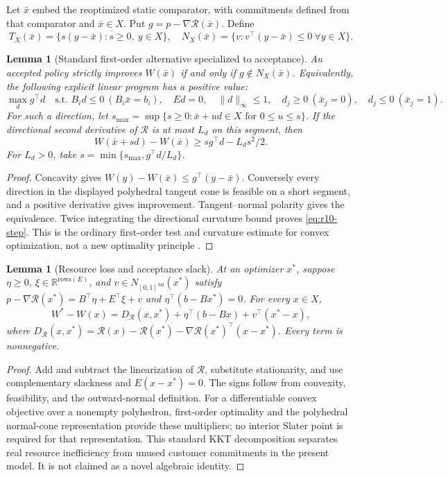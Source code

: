 \documentclass[11pt,letterpaper]{article}
\newtheorem{lemma}[theorem]{Lemma}
\theoremstyle{definition}
\newcommand{\R}{\mathbb R}
\newcommand{\1}{\mathbf 1}
\begin{document}
Let $\bar x$ embed the reoptimized static comparator, with commitments defined from that comparator and $\bar x\in X$. Put $g=p-\nabla\mathcal R(\bar x)$. Define
\[
 T_X(\bar x)=\overline{\{s(y-\bar x):s\geq0,\ y\in X\}},\quad
 N_X(\bar x)=\{v:v^\top(y-\bar x)\leq0\ \forall y\in X\}.
\]
\begin{lemma}[Standard first-order alternative specialized to acceptance]\label{lem:r10-alternative}
An accepted policy strictly improves $W(\bar x)$ if and only if $g\notin N_X(\bar x)$. Equivalently, the following explicit linear program has a positive value:
\[
 \max_d g^\top d\quad\text{s.t. } B_i d\leq0\ (B_i\bar x=b_i),\quad Ed=0,\quad
 \|d\|_\infty\leq1,\quad
 d_j\geq0\ (\bar x_j=0),\quad d_j\leq0\ (\bar x_j=1).
\]
For such a direction, let $s_{\max}=\sup\{s\geq0:\bar x+ud\in X\text{ for }0\leq u\leq s\}$. If the directional second derivative of $\mathcal R$ is at most $L_d$ on this segment, then
\begin{equation}\label{eq:r10-step}
 W(\bar x+sd)-W(\bar x)\geq s g^\top d-L_ds^2/2.
\end{equation}
For $L_d>0$, take $s=\min\{s_{\max},g^\top d/L_d\}$.
\end{lemma}
\begin{proof}
Concavity gives $W(y)-W(\bar x)\leq g^\top(y-\bar x)$. Conversely every direction in the displayed polyhedral tangent cone is feasible on a short segment, and a positive derivative gives improvement. Tangent--normal polarity gives the equivalence. Twice integrating the directional curvature bound proves \eqref{eq:r10-step}. This is the ordinary first-order test and curvature estimate for convex optimization, not a new optimality principle \citep{BoydVandenberghe2004}.
\end{proof}

\begin{lemma}[Resource loss and acceptance slack]\label{lem:r10-bregman}
At an optimizer $x^*$, suppose $\eta\geq0$, $\xi\in\R^{\mathrm{rows}(E)}$, and $v\in N_{[0,1]^{Nd}}(x^*)$ satisfy
$p-\nabla\mathcal R(x^*)=B^\top\eta+E^\top\xi+v$ and $\eta^\top(b-Bx^*)=0$. For every $x\in X$,
\[
 W^*-W(x)=D_{\mathcal R}(x,x^*)+\eta^\top(b-Bx)+v^\top(x^*-x),
\]
where $D_{\mathcal R}(x,x^*)=\mathcal R(x)-\mathcal R(x^*)-\nabla\mathcal R(x^*)^\top(x-x^*)$. Every term is nonnegative.
\end{lemma}
\begin{proof}
Add and subtract the linearization of $\mathcal R$, substitute stationarity, and use complementary slackness and $E(x-x^*)=0$. The signs follow from convexity, feasibility, and the outward-normal definition. For a differentiable convex objective over a nonempty polyhedron, first-order optimality and the polyhedral normal-cone representation provide these multipliers; no interior Slater point is required for that representation. This standard KKT decomposition \citep{BoydVandenberghe2004} separates real resource inefficiency from unused customer commitments in the present model. It is not claimed as a novel algebraic identity.
\end{proof}
\end{document}
